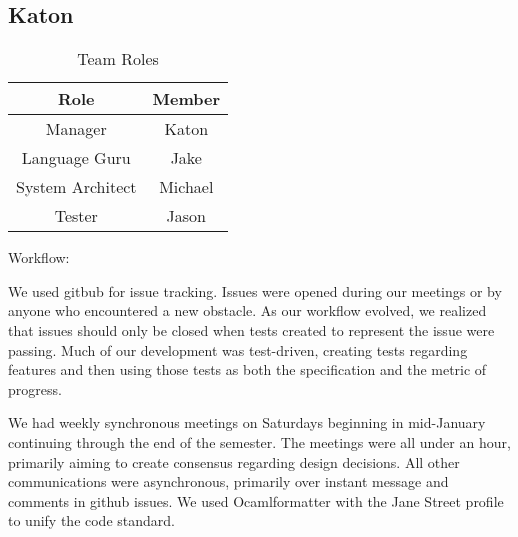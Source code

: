 \subsection{Katon}


\begin{table}[]
	\caption{Team Roles}
    \centering
    \begin{tabular}{|c|c|}
    	\hline
         Role & Member \\\hline
         Manager & Katon \\
         Language Guru & Jake \\
         System Architect & Michael\\
         Tester & Jason\\\hline
    \end{tabular}
\end{table}

Workflow:

We used gitbub for issue tracking. Issues were opened during our meetings or by anyone who encountered a new obstacle. As our workflow evolved, we realized that issues should only be closed when tests created to represent the issue were passing. Much of our development was test-driven, creating tests regarding features and then using those tests as both the specification and the metric of progress. 

We had weekly synchronous meetings on Saturdays beginning in mid-January continuing through the end of the semester. The meetings were all under an hour, primarily aiming to create consensus regarding design decisions. All other communications were asynchronous, primarily over instant message and comments in github issues.
We used Ocamlformatter with the Jane Street profile to unify the code standard.



